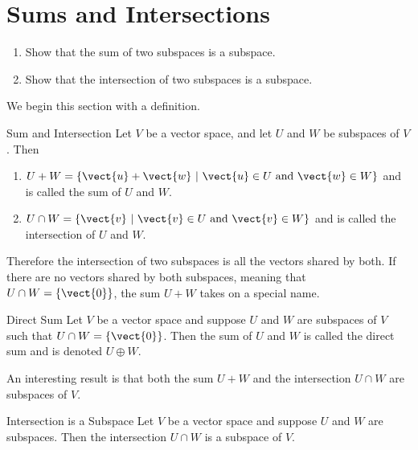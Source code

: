 \section{Sums and Intersections}

\begin{outcome}
\begin{enumerate}
\item[A.] Show that the sum of two subspaces is a subspace.

\item[B.] Show that the intersection of two subspaces is a subspace.
\end{enumerate}
\end{outcome}

We begin this section with a definition.

\begin{definition}{Sum and Intersection}\label{def:sumintersection}
Let $V$ be a vector space, and let $U$ and $W$ be subspaces of
$V$.  
Then
\begin{enumerate}
\item $U+W = \{ \vect{u}+\vect{w} ~|~ \vect{u}\in U\mbox{ and } \vect{w}\in W\}$ and is 
called the sum of $U$ and $W$.

\item $U\cap W = \{ \vect{v} ~|~ \vect{v}\in U\mbox{ and } \vect{v}\in W\}$ and is 
called the intersection of $U$ and $W$.
\end{enumerate}
\end{definition}

Therefore the intersection of two subspaces is all the vectors shared by both. If there are no vectors shared by both subspaces, meaning that $U \cap W = \left\{ \vect{0} \right\}$, the sum $U+W$ takes on a special name.

\begin{definition}{Direct Sum}\label{def:directsum}
Let $V$ be a vector space and suppose $U$ and $W$ are subspaces of $V$ such that  $U \cap W = \left\{ \vect{0} \right\}$. Then the sum of $U$ and $W$ is called the direct sum and is denoted $U \oplus W$. 
\end{definition}

An interesting result is that both the sum $U + W$ and the intersection $U \cap W$ are subspaces of $V$. 

\begin{example}{Intersection is a Subspace}\label{exa:intersectionsubspace}
Let $V$ be a vector space and suppose $U$ and $W$ are subspaces. Then the intersection $U \cap W$ is a subspace of $V$.
\end{example}

